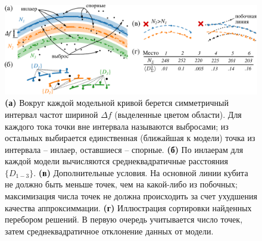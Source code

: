 \documentclass[14pt, a4paper]{extarticle}
\begin{document}
\begin{figure}[t]
	\centering
	\includegraphics[width=\linewidth]{Pictures/hough_illustration}
	\caption{\textbf{(а)} Вокруг каждой модельной кривой берется симметричный интервал частот шириной $\Delta f$ (выделенные цветом области). Для каждого тока точки вне интервала называются выбросами; из остальных выбирается единственная (ближайшая к модели) точка из интервала -- инлаер, оставшиеся -- спорные. \textbf{(б)} По инлаерам для каждой модели вычисляются среднеквадратичные расстояния $\{D_{1-3}\}$. \textbf{(в)} Дополнительные условия. На основной линии кубита не должно быть меньше точек, чем на какой-либо из побочных; максимизация числа точек не должна происходить за счет ухудшения качества аппроксиммации. \textbf{(г)} Иллюстрация сортировки найденных перебором решений. В первую очередь учитывается число точек, затем среднеквадратичное отклонение данных от модели.}
	\label{fig:houghillustration}
\end{figure}
\end{document}
